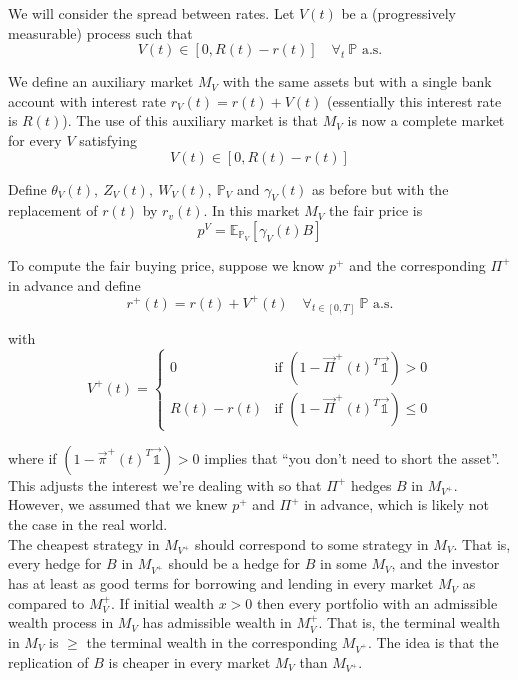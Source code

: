 \documentclass[12pt]{article}
\newlength\tindent
\renewcommand{\indent}{\hspace*{\tindent}}
\renewcommand{\P}{\mathbb P}
\newcommand{\E}{\mathbb E}
\begin{document}
\indent We will consider the spread between rates. Let $V(t)$ be a (progressively measurable) process such that
\begin{equation*}
	V(t) \in [0, R(t) - r(t)] \quad \forall_t~\P \text{ a.s.}
\end{equation*}

\indent We define an auxiliary market $M_V$ with the same assets but with a single bank account with interest rate $r_V(t) = r(t) + V(t)$ (essentially this interest rate is $R(t)$). The use of this auxiliary market is that $M_V$ is now a complete market for every $V$ satisfying
\begin{equation*}
	V(t) \in [0, R(t) - r(t)] 
\end{equation*}

\indent Define $\theta_V(t),~Z_V(t),~W_V(t),~\P_V$ and $\gamma_V(t)$ as before but with the replacement of $r(t)$ by $r_v(t)$. In this market $M_V$ the fair price is
\begin{equation*}
	p^V = \E_{\P_V} \left[ \gamma_V(t) B \right]
\end{equation*}

\indent To compute the fair buying price, suppose we know $p^+$ and the corresponding $\Pi^+$ in advance and define
\begin{equation*}
	r^+(t) = r(t) + V^+(t) \quad \forall_{t \in [0, T]}~\P \text{ a.s.}
\end{equation*}

with
\begin{equation*}
	V^+(t) =
	\begin{cases}
		0 & \text{if } \left(1 - \vec{\Pi}^+(t)^T \mathds {\vec{1}} \right) > 0 \\
		R(t) - r(t) & \text{if } \left(1 - \vec{\Pi}^+(t)^T \mathds {\vec{1}} \right) \leq 0
	\end{cases}
\end{equation*}

where if $\left(1 - \vec{\pi}^+(t)^T \mathds {\vec{1}} \right) > 0$ implies that ``you don't need to short the asset''. This adjusts the interest we're dealing with so that $\Pi^+$ hedges $B$ in $M_{V^+}$. However, we assumed that we knew $p^+$ and $\Pi^+$ in advance, which is likely not the case in the real world. \\

\indent The cheapest strategy in $M_{V^+}$ should correspond to some strategy in $M_V$. That is, every hedge for $B$ in $M_{V^+}$ should be a hedge for $B$ in some $M_V$, and the investor has at least as good terms for borrowing and lending in every market $M_V$ as compared to $M_V^+$. If initial wealth $x > 0$ then every portfolio with an admissible wealth process in $M_V$ has admissible wealth in $M_V^+$. That is, the terminal wealth in $M_V$ is $\geq$ the terminal wealth in the corresponding $M_{V^+}$. The idea is that the replication of $B$ is cheaper in every market $M_V$ than $M_{V^+}$. \\
\end{document}

